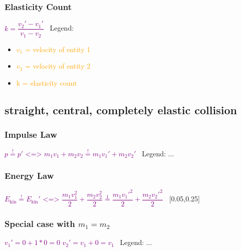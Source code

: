 \documentclass[main.tex,fontsize=8pt,paper=a4,paper=portrait,DIV=calc,]{scrartcl}
\begin{document}
\begin{multicols*}{2}
\subsubsection{Elasticity Count}
\vspace{2mm}
\large \textcolor{purple}{\( k = \dfrac{v_2' - v_1'}{v_1 - v_2} \)}\newline
\normalsize \, \newline
Legend:\newline
\begin{itemize}
\item \textcolor{orange}{\(v_1\) = velocity of entity 1}
\item \textcolor{orange}{\(v_2\) = velocity of entity 2}
\item \textcolor{orange}{k = elasticity count}
\end{itemize} 


\subsection{straight, central, completely elastic collision}

\subsubsection{Impulse Law}
\vspace{2mm}
\large \textcolor{purple}{\( p \overset{!}{=} p' \text{ <=> } m_1v_1 + m_2v_2 \overset{!}{=} m_1v_1' + m_2v_2' \)}\newline
\normalsize \, \newline
Legend:\newline
...

\subsubsection{Energy Law}
\vspace{2mm}
\large \textcolor{purple}{\( E_{\text{kin}} \overset{!}{=} E_{\text{kin}}' \text{ <=> } \dfrac{m_1v_1^2}{2} + \dfrac{m_2v_2^2}{2} \overset{1}{=} \dfrac{m_1v_1'^2}{2} + \dfrac{m_2v_2'^2}{2} \)}\newline
\normalsize \, \newline
{}[0.05,0.25]

\subsubsection{Special case with \(m_1 = m_2\)}
\vspace{2mm}
\large \textcolor{purple}{\( v_1' = 0 + 1 * 0 = 0 \)}\newline
\textcolor{purple}{\( v_2' = v_1 + 0 = v_1\)}\newline
\normalsize \, \newline
Legend: \newline
...



\end{multicols*}
\end{document}
